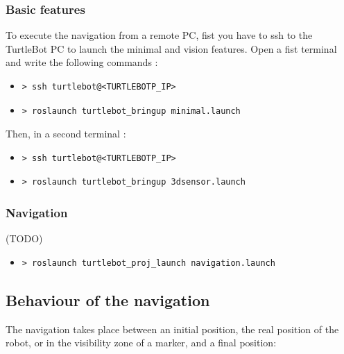 \documentclass[10pt,a4paper]{article}
\begin{document}
\subsubsection{Basic features}

To execute the navigation from a remote PC, fist you have to ssh to the TurtleBot PC to launch the minimal and vision features. Open a fist terminal and write the following commands :

\begin{itemize}
\item[]  \begin{verbatim}> ssh turtlebot@<TURTLEBOTP_IP> \end{verbatim}
\item[]  \begin{verbatim}> roslaunch turtlebot_bringup minimal.launch \end{verbatim}
\end{itemize}

Then, in a second terminal :

\begin{itemize}
\item[]  \begin{verbatim}> ssh turtlebot@<TURTLEBOTP_IP> \end{verbatim}
\item[]  \begin{verbatim}> roslaunch turtlebot_bringup 3dsensor.launch \end{verbatim}
\end{itemize}

\subsubsection{Navigation}

(TODO)

\begin{itemize}
\item[]  \begin{verbatim}> roslaunch turtlebot_proj_launch navigation.launch \end{verbatim}
\end{itemize}

\subsection{Behaviour of the navigation}

The navigation takes place between an initial position, the real position of the robot, or in the visibility zone of a marker, and a final position:
\end{document}
